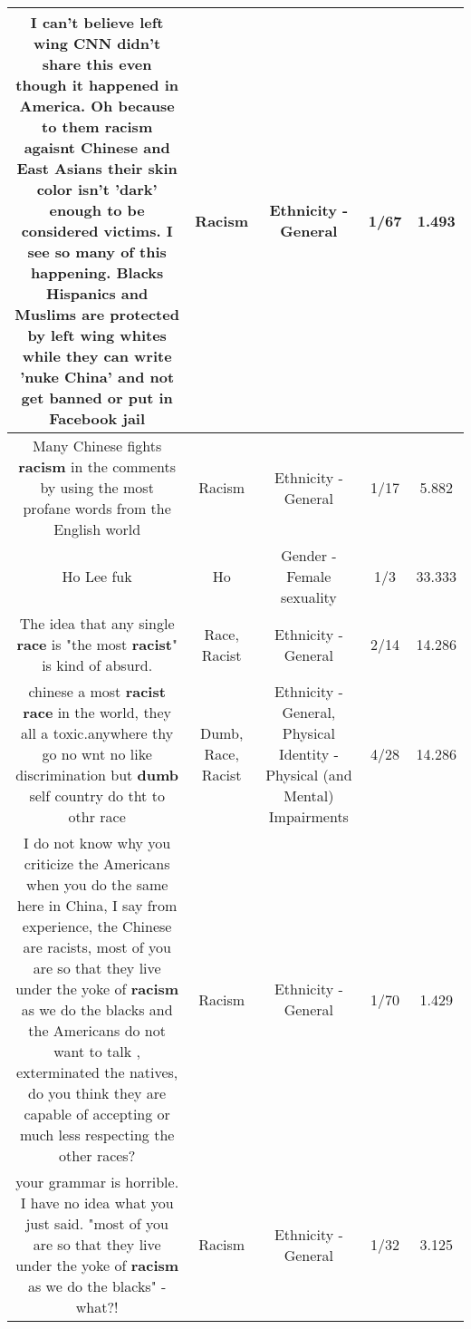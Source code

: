\documentclass[11pt]{article}
\newlength\mylength
\begin{document}
\begin{center}
\begin{longtable}{|C{.65\mylength}|C{.30\mylength}|C{.12\mylength}|C{.12\mylength}|C{.12\mylength}|}
  \small I can't believe left wing CNN didn't share this even though it happened in America. Oh because to them \textbf{racism} agaisnt Chinese and East Asians their skin color isn't 'dark' enough to be considered victims. I see so many of this happening. Blacks Hispanics and Muslims are protected by left wing whites while they can write 'nuke China' and not get banned or put in Facebook jail\normalsize   & Racism & Ethnicity - General & 1/67 & 1.493 \\  \hline
  \small Many Chinese fights \textbf{racism} in the comments by using the most profane words from the English world\normalsize   & Racism & Ethnicity - General & 1/17 & 5.882 \\  \hline
  \small Ho Lee fuk\normalsize   & Ho & Gender - Female sexuality & 1/3 & 33.333 \\  \hline
  \small The idea that any single \textbf{race} is "the most \textbf{racist}" is kind of absurd.\normalsize   & Race, Racist & Ethnicity - General & 2/14 & 14.286 \\  \hline
  \small chinese a most \textbf{racist} \textbf{race} in the world, they all a toxic.anywhere thy go no wnt no like discrimination but \textbf{dumb} self country do tht to othr race\normalsize   & Dumb, Race, Racist & Ethnicity - General, Physical Identity - Physical (and Mental) Impairments & 4/28 & 14.286 \\  \hline
  \small I do not know why you criticize the Americans when you do the same here in China, I say from experience, the Chinese are racists, most of you are so that they live under the yoke of \textbf{racism} as we do the blacks and the Americans do not want to talk , exterminated the natives, do you think they are capable of accepting or much less respecting the other races?\normalsize   & Racism & Ethnicity - General & 1/70 & 1.429 \\  \hline
  \small your grammar is horrible.  I have no idea what you just said. "most of you are so that they live under the yoke of \textbf{racism} as we do the blacks" - what?!\normalsize   & Racism & Ethnicity - General & 1/32 & 3.125 \\  \hline

\end{longtable}
\end{center}
\end{document}

